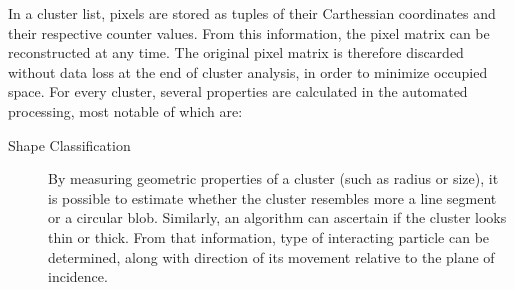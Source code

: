 In a cluster list, pixels are stored as tuples of their Carthessian coordinates and their respective counter values. From this information, the pixel matrix can be reconstructed at any time. The original pixel matrix is therefore discarded without data loss at the end of cluster analysis, in order to minimize occupied space. For every cluster, several properties are calculated in the automated processing, most notable of which are:

\label{db:cluster-properties}
\begin{description}
	\item[Shape Classification]
	\label{db:shape-classification}
	By measuring geometric properties of a cluster (such as radius or size), it is possible to estimate whether the cluster resembles more a line segment or a circular blob. Similarly, an algorithm can ascertain if the cluster looks thin or thick. From that information, type of interacting particle can be determined, along with direction of its movement relative to the plane of incidence. 

	\todo


    \begin{figure}[t]
    \begin{center}

\end{center}
\end{figure}
\end{description}
